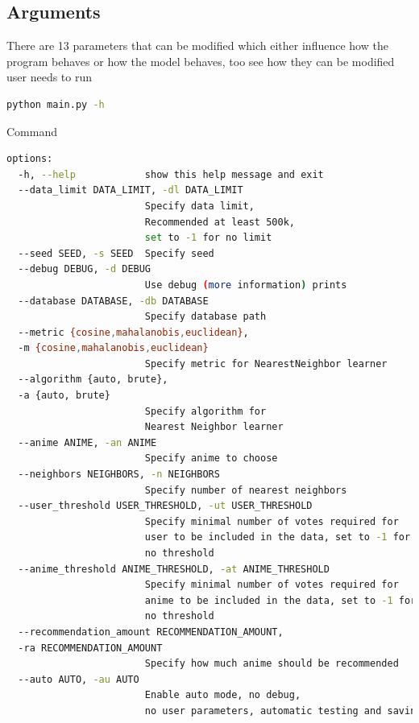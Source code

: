 \documentclass[12pt]{article}
\begin{document}
  \subsection{Arguments}
  There are 13 parameters that can be modified which either influence how the program behaves or how the model behaves, too see how they can be modified user needs to run 
  \begin{lstlisting}[language=bash]
    python main.py -h
  \end{lstlisting}
  Command    
  \begin{lstlisting}[language=bash]
    options:
  -h, --help            show this help message and exit
  --data_limit DATA_LIMIT, -dl DATA_LIMIT
                        Specify data limit,
                        Recommended at least 500k,
                        set to -1 for no limit
  --seed SEED, -s SEED  Specify seed
  --debug DEBUG, -d DEBUG
                        Use debug (more information) prints
  --database DATABASE, -db DATABASE
                        Specify database path
  --metric {cosine,mahalanobis,euclidean},
  -m {cosine,mahalanobis,euclidean}
                        Specify metric for NearestNeighbor learner
  --algorithm {auto, brute},
  -a {auto, brute}
                        Specify algorithm for
                        Nearest Neighbor learner
  --anime ANIME, -an ANIME
                        Specify anime to choose
  --neighbors NEIGHBORS, -n NEIGHBORS
                        Specify number of nearest neighbors
  --user_threshold USER_THRESHOLD, -ut USER_THRESHOLD
                        Specify minimal number of votes required for
                        user to be included in the data, set to -1 for
                        no threshold
  --anime_threshold ANIME_THRESHOLD, -at ANIME_THRESHOLD
                        Specify minimal number of votes required for
                        anime to be included in the data, set to -1 for
                        no threshold
  --recommendation_amount RECOMMENDATION_AMOUNT,
  -ra RECOMMENDATION_AMOUNT
                        Specify how much anime should be recommended
  --auto AUTO, -au AUTO
                        Enable auto mode, no debug,
                        no user parameters, automatic testing and saving results
  \end{lstlisting}
\end{document}
